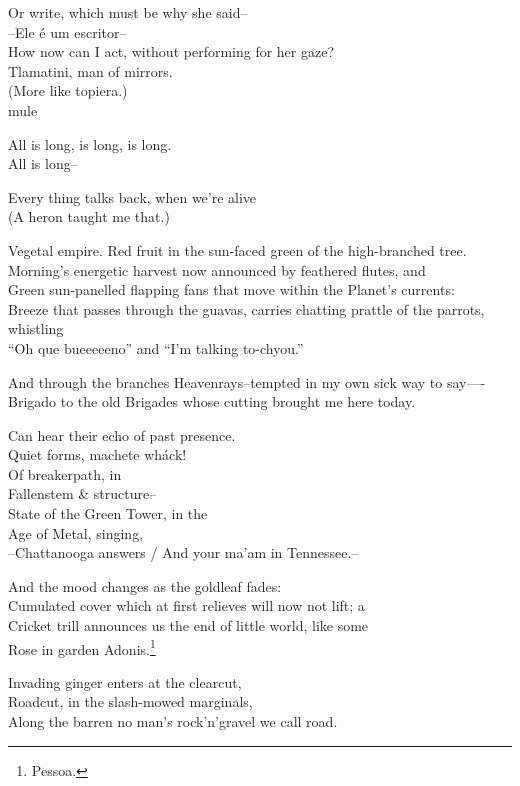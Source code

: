 Or write, which must be why she said-- \\
--Ele é um escritor-- \\
How now can I act, without performing for her gaze? \\
Tlamatini, man of mirrors. \\
(More like topiera.) \\
\qquad\qquad mule

\secdiv

All is long, is long, is long. \\
All is long--

Every thing talks back, when we're alive \\
(A heron taught me that.)

Vegetal empire. Red fruit in the sun-faced green of the high-branched tree. \\
Morning's energetic harvest now announced by feathered flutes, and \\
Green sun-panelled flapping fans that move within the Planet's currents: \\
Breeze that passes through the guavas, carries chatting prattle of the parrots, whistling \\
``Oh que bueeeeeno'' and ``I'm talking to-chyou.''

And through the branches Heavenrays--tempted in my own sick way to say—- \\
Brigado to the old Brigades whose cutting brought me here today. 

Can hear their echo of past presence. \\
Quiet forms, machete wháck! \\
Of breakerpath, in \\
Fallenstem \& structure-- \\
State of the Green Tower, in the \\
Age of Metal, singing, \\
--Chattanooga answers / And your ma'am in Tennessee.-- 

And the mood changes as the goldleaf fades: \\
Cumulated cover which at first relieves will now not lift; a \\
Cricket trill announces us the end of little world, like some \\
Rose in garden Adonis.\footnote{Pessoa.}

Invading ginger enters at the clearcut, \\
Roadcut, in the slash-mowed marginals, \\
Along the barren no man's rock'n'gravel we call road. 

